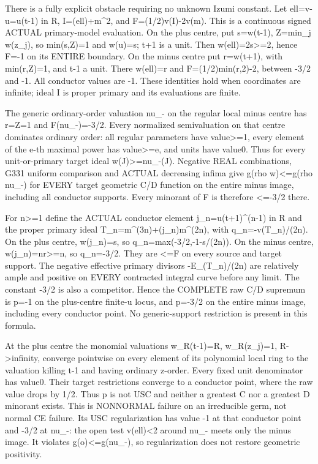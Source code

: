 There is a fully explicit obstacle requiring no unknown Izumi constant. Let ell=v-u=u(t-1) in R, I=(ell)+m\textasciicircum{}2, and F=(1/2)v(I)-2v(m). This is a continuous signed ACTUAL primary-model evaluation. On the plus centre, put s=w(t-1), Z=min\_j w(z\_j), so min(s,Z)=1 and w(u)=s; t+1 is a unit. Then w(ell)=2s\textgreater{}=2, hence F=-1 on its ENTIRE boundary. On the minus centre put r=w(t+1), with min(r,Z)=1, and t-1 a unit. There w(ell)=r and F=(1/2)min(r,2)-2, between -3/2 and -1. All conductor values are -1. These identities hold when coordinates are infinite; ideal I is proper primary and its evaluations are finite.

The generic ordinary-order valuation nu\_- on the regular local minus centre has r=Z=1 and F(nu\_-)=-3/2. Every normalized semivaluation on that centre dominates ordinary order: all regular parameters have value\textgreater{}=1, every element of the e-th maximal power has value\textgreater{}=e, and units have value0. Thus for every unit-or-primary target ideal w(J)\textgreater{}=nu\_-(J). Negative REAL combinations, G331 uniform comparison and ACTUAL decreasing infima give g(rho w)\textless{}=g(rho nu\_-) for EVERY target geometric C/D function on the entire minus image, including all conductor supports. Every minorant of F is therefore \textless{}=-3/2 there.

For n\textgreater{}=1 define the ACTUAL conductor element j\_n=u(t+1)\textasciicircum{}(n-1) in R and the proper primary ideal T\_n=m\textasciicircum{}(3n)+(j\_n)m\textasciicircum{}(2n), with q\_n=-v(T\_n)/(2n). On the plus centre, w(j\_n)=s, so q\_n=max(-3/2,-1-s/(2n)). On the minus centre, w(j\_n)=nr\textgreater{}=n, so q\_n=-3/2. They are \textless{}=F on every source and target support. The negative effective primary divisors -E\_(T\_n)/(2n) are relatively ample and positive on EVERY contracted integral curve before any limit. The constant -3/2 is also a competitor. Hence the COMPLETE raw C/D supremum is
p=-1 on the plus-centre finite-u locus, and p=-3/2 on the entire minus image, including every conductor point.
No generic-support restriction is present in this formula.

At the plus centre the monomial valuations w\_R(t-1)=R, w\_R(z\_j)=1, R-\textgreater{}infinity, converge pointwise on every element of its polynomial local ring to the valuation killing t-1 and having ordinary z-order. Every fixed unit denominator has value0. Their target restrictions converge to a conductor point, where the raw value drops by 1/2. Thus p is not USC and neither a greatest C nor a greatest D minorant exists. This is NONNORMAL failure on an irreducible germ, not normal CE failure. Its USC regularization has value -1 at that conductor point and -3/2 at nu\_-: the open test v(ell)\textless{}2 around nu\_- meets only the minus image. It violates g(o)\textless{}=g(nu\_-), so regularization does not restore geometric positivity.

